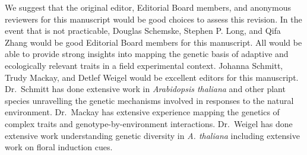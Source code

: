 \documentclass[
  letterpaper,
  DIV=11,
  numbers=noendperiod]{scrartcl}
\begin{document}
We suggest that the original editor, Editorial Board members, and
anonymous reviewers for this manuscript would be good choices to assess
this revision. In the event that is not practicable, Douglas Schemske,
Stephen P. Long, and Qifa Zhang would be good Editorial Board members
for this manuscript. All would be able to provide strong insights into
mapping the genetic basis of adaptive and ecologically relevant traits
in a field experimental context. Johanna Schmitt, Trudy Mackay, and
Detlef Weigel would be excellent editors for this manuscript.
Dr.~Schmitt has done extensive work in \emph{Arabidopsis thaliana} and
other plant species unravelling the genetic mechanisms involved in
responses to the natural environment. Dr.~Mackay has extensive
experience mapping the genetics of complex traits and
genotype-by-environment interactions. Dr.~Weigel has done extensive work
understanding genetic diversity in \emph{A. thaliana} including
extensive work on floral induction cues.
\end{document}

